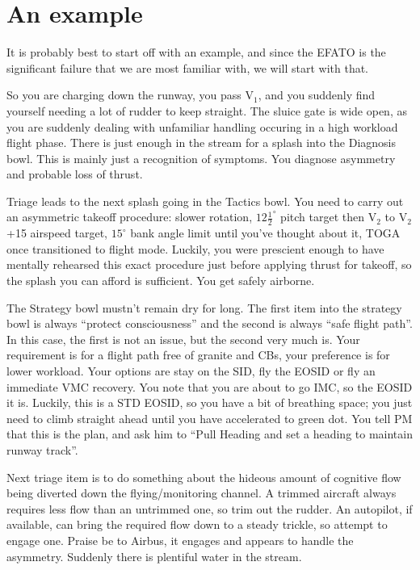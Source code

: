 \documentclass[a5paper,11pt,titlepage]{article} \usepackage[utf8]{inputenc}
\begin{document}
\section{An example}

It is probably best to start off with an example, and since the EFATO is
the significant failure that we are most familiar with, we will start
with that.

So you are charging down the runway, you pass V$_1$, and you suddenly
find yourself needing a lot of rudder to keep straight. The sluice gate
is wide open, as you are suddenly dealing with unfamiliar handling
occuring in a high workload flight phase. There is just enough in the
stream for a splash into the Diagnosis bowl. This is mainly just a
recognition of symptoms. You diagnose asymmetry and probable loss of
thrust.

Triage leads to the next splash going in the Tactics bowl. You need to
carry out an asymmetric takeoff procedure: slower rotation,
$12\frac{1}{2}^{\circ}$ pitch target then V$_2$ to V$_2$+15 airspeed
target, $15^{\circ}$ bank angle limit until you've thought about it,
TOGA once transitioned to flight mode. Luckily, you were prescient
enough to have mentally rehearsed this exact procedure just before
applying thrust for takeoff, so the splash you can afford is
sufficient. You get safely airborne.

The Strategy bowl mustn't remain dry for long. The first item into the
strategy bowl is always ``protect consciousness'' and the second is
always ``safe flight path''. In this case, the first is not an issue,
but the second very much is. Your requirement is for a flight path free
of granite and CBs, your preference is for lower workload. Your options
are stay on the SID, fly the EOSID or fly an immediate VMC recovery. You
note that you are about to go IMC, so the EOSID it is. Luckily, this is
a STD EOSID, so you have a bit of breathing space; you just need to
climb straight ahead until you have accelerated to green dot. You tell
PM that this is the plan, and ask him to ``Pull Heading and set a
heading to maintain runway track''.

Next triage item is to do something about the hideous amount of
cognitive flow being diverted down the flying/monitoring channel. A
trimmed aircraft always requires less flow than an untrimmed one, so
trim out the rudder. An autopilot, if available, can bring the required
flow down to a steady trickle, so attempt to engage one. Praise be to
Airbus, it engages and appears to handle the asymmetry. Suddenly there
is plentiful water in the stream.
\end{document}
